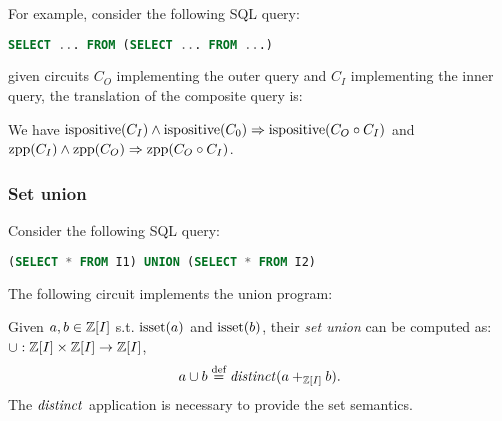 For example, consider the following SQL query:

\begin{lstlisting}[language=SQL]
SELECT ... FROM (SELECT ... FROM ...)
\end{lstlisting}

\noindent given circuits $C_O$ implementing the outer query and $C_I$
implementing the inner query, the translation of the composite query is:

\begin{center}
\end{center}

We have $\mbox{ispositive}(C_I) \land \mbox{ispositive}(C_0) \Rightarrow \mbox{ispositive}(C_O \circ C_I)$
and $\mbox{zpp}(C_I) \land \mbox{zpp}(C_O) \Rightarrow \mbox{zpp}(C_O \circ C_I)$.

\subsubsection{Set union}

Consider the following SQL query:

\begin{lstlisting}[language=SQL]
(SELECT * FROM I1) UNION (SELECT * FROM I2)
\end{lstlisting}

The following circuit implements the union program:

\begin{center}
\end{center}

Given \zrs $a, b \in \mathbb{Z}[I]$ s.t. $\mbox{isset}(a)$ and $\mbox{isset}(b)$, their \emph{set union} 
can be computed as: $\cup: \mathbb{Z}[I] \times \mathbb{Z}[I] \rightarrow \mathbb{Z}[I]$,  $$a
\cup b \stackrel{\textrm{\scriptsize def}}{=} \mathit{distinct}(a +_{\mathbb{Z}[I]} b).$$  
The $\mathit{distinct}$ application is necessary to provide the set semantics.

